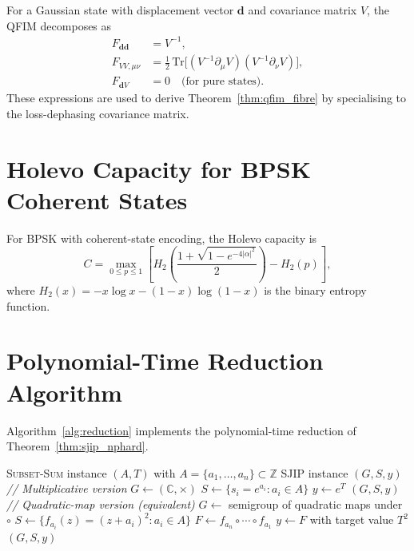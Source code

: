 \documentclass[journal,twocolumn]{IEEEtran}
\theoremstyle{definition}
\theoremstyle{plain}
\newcommand{\C}{\mathbb{C}}
\newcommand{\Z}{\mathbb{Z}}
\newcommand{\Tr}{\mathrm{Tr}}
\begin{document}
For a Gaussian state with displacement vector $\mathbf{d}$ and
covariance matrix $V$, the QFIM decomposes as
\begin{align}
  F_{\mathbf{d}\mathbf{d}} &= V^{-1}, \label{eq:Fdd}\\
  F_{VV,\mu\nu} &= \tfrac{1}{2}\,\Tr\!\bigl[(V^{-1}\partial_\mu V)
    (V^{-1}\partial_\nu V)\bigr], \label{eq:FVV}\\
  F_{\mathbf{d}V} &= 0 \quad \text{(for pure states)}. \label{eq:FdV}
\end{align}
These expressions are used to derive Theorem~\ref{thm:qfim_fibre} by
specialising to the loss-dephasing covariance matrix.

\section{Holevo Capacity for BPSK Coherent States}
\label{app:holevo_bpsk}

For BPSK with coherent-state encoding, the Holevo capacity is
\begin{equation}
  C = \max_{0 \le p \le 1}\!\left[
    H_2\!\left(\frac{1+\sqrt{1-e^{-4|\alpha|^2}}}{2}\right)
    - H_2(p)\right],
\end{equation}
where $H_2(x) = -x\log x - (1-x)\log(1-x)$ is the binary entropy
function.

\section{Polynomial-Time Reduction Algorithm}
\label{app:reduction}

Algorithm~\ref{alg:reduction} implements the polynomial-time
reduction of Theorem~\ref{thm:sjip_nphard}.

\begin{algorithm}[H]
\caption{Polynomial-Time Reduction: \textsc{Subset-Sum} to SJIP}
\label{alg:reduction}
\begin{algorithmic}[1]
\Require \textsc{Subset-Sum} instance $(A, T)$ with
         $A = \{a_1,\ldots,a_n\} \subset \Z$
\Ensure SJIP instance $(G, S, y)$
\State \textit{// Multiplicative version}
\State $G \leftarrow (\C, \times)$
\State $S \leftarrow \{s_i = e^{a_i} : a_i \in A\}$
\State $y \leftarrow e^T$
\Return $(G, S, y)$
\State \textit{// Quadratic-map version (equivalent)}
\State $G \leftarrow$ semigroup of quadratic maps under $\circ$
\State $S \leftarrow \{f_{a_i}(z) = (z+a_i)^2 : a_i \in A\}$
\State $F \leftarrow f_{a_n} \circ \cdots \circ f_{a_1}$
\State $y \leftarrow F$ with target value $T^2$
\Return $(G, S, y)$
\end{algorithmic}
\end{algorithm}
\end{document}
